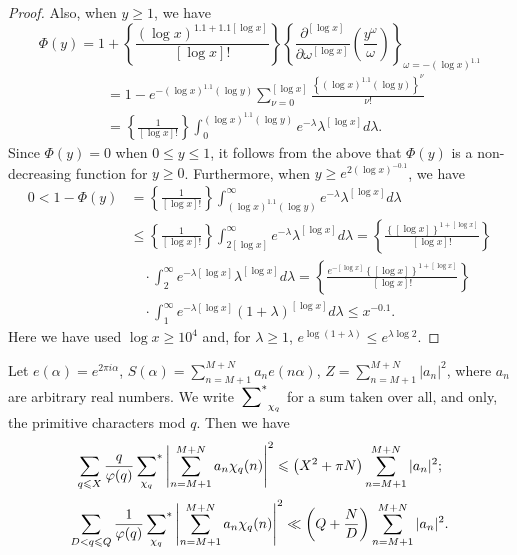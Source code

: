 \begin{proof}
Also, when $y\geqslant1$, we have
\[
\Phi(y)=1+\left\{\frac{(\log x)^{1.1+1.1[\log x]}}{[\log x]!}\right\}
\left\{\frac{\partial^{[\log x]}}{\partial\omega^{[\log x]}}
\left(\frac{y^\omega}{\omega}\right)\right\}_{\omega=-(\log x)^{1.1}}
\]
\begin{align*}
&=1-e^{-(\log x)^{1.1}(\log y)}\sum_{\nu=0}^{[\log x]}
\frac{\left\{(\log x)^{1.1}(\log y)\right\}^\nu}{\nu!}\\
&=\left\{\frac{1}{[\log x]!}\right\}
\int_{0}^{(\log x)^{1.1}(\log y)}e^{-\lambda}\lambda^{[\log x]}d\lambda.
\end{align*}
Since $\Phi(y)=0$ when $0\leqslant y\leqslant1$, it follows from the above that $\Phi(y)$ is a non-decreasing function for $y\geqslant0$. Furthermore, when $y\geqslant e^{2(\log x)^{-0.1}}$, we have
\begin{align*}
0<1-\Phi(y)
&=\left\{\frac{1}{[\log x]!}\right\}
\int_{(\log x)^{1.1}(\log y)}^{\infty}e^{-\lambda}\lambda^{[\log x]}d\lambda\\
&\leqslant\left\{\frac{1}{[\log x]!}\right\}
\int_{2[\log x]}^{\infty}e^{-\lambda}\lambda^{[\log x]}d\lambda
=\left\{\frac{\left\{[\log x]\right\}^{1+[\log x]}}{[\log x]!}\right\}\\
&\quad\cdot\int_{2}^{\infty}e^{-\lambda[\log x]}\lambda^{[\log x]}d\lambda
=\left\{\frac{e^{-[\log x]}\left\{[\log x]\right\}^{1+[\log x]}}{[\log x]!}\right\}\\
&\quad\cdot\int_{1}^{\infty}e^{-\lambda[\log x]}(1+\lambda)^{[\log x]}d\lambda
\leqslant x^{-0.1}.
\end{align*}
Here we have used $\log x\geqslant10^4$ and, for $\lambda\geqslant1$, $e^{\log(1+\lambda)}\leqslant e^{\lambda\log2}$.
\end{proof}

\begin{lemma}
Let $e(\alpha)=e^{2\pi i\alpha}$, $S(\alpha)=\sum_{n=M+1}^{M+N}a_n e(n\alpha)$, $Z=\sum_{n=M+1}^{M+N}|a_n|^2$, where $a_n$ are arbitrary real numbers. We write $\sideset{}{^*}\sum_{\chi_q}$ for a sum taken over all, and only, the primitive characters mod $q$. Then we have
\begin{equation}\label{eq:chen2en}
\sum_{q\leqslant X}\frac{q}{\varphi(q)}
\sideset{}{^*}\sum_{\chi_q}
\left|\sum_{n=M+1}^{M+N}a_n\chi_q(n)\right|^2
\leqslant\left(X^2+\pi N\right)\sum_{n=M+1}^{M+N}|a_n|^2;
\end{equation}
\begin{equation}\label{eq:chen3en}
\sum_{D<q\leqslant Q}\frac{1}{\varphi(q)}
\sideset{}{^*}\sum_{\chi_q}
\left|\sum_{n=M+1}^{M+N}a_n\chi_q(n)\right|^2
\ll\left(Q+\frac{N}{D}\right)\sum_{n=M+1}^{M+N}|a_n|^2.
\end{equation}
\end{lemma}

